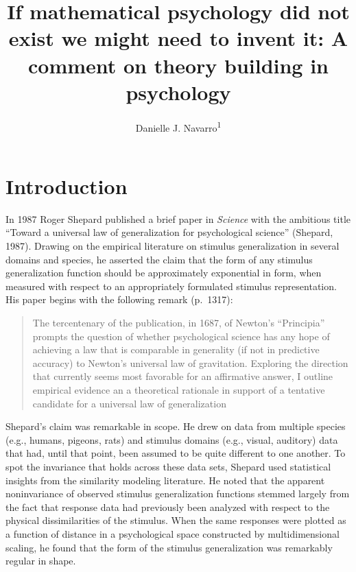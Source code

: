 \documentclass[
  english,
  doc]{apa6}
\author{Danielle J. Navarro\textsuperscript{1}}
\affiliation{
\vspace{0.5cm}
\textsuperscript{1} School of Psychology, University of New South Wales}
\title{If mathematical psychology did not exist we might need to invent it: A comment on theory building in psychology}
\date{}
\begin{document}
\maketitle

\vspace*{12pt}
\newpage

\hypertarget{introduction}{%
\section{Introduction}\label{introduction}}

\noindent
In 1987 Roger Shepard published a brief paper in \emph{Science} with the ambitious title \enquote{Toward a universal law of generalization for psychological science} (Shepard, 1987). Drawing on the empirical literature on stimulus generalization in several domains and species, he asserted the claim that the form of any stimulus generalization function should be approximately exponential in form, when measured with respect to an appropriately formulated stimulus representation. His paper begins with the following remark (p.~1317):

\begin{quote}
The tercentenary of the publication, in 1687, of Newton's \enquote{Principia} prompts the question of whether psychological science has any hope of achieving a law that is comparable in generality (if not in predictive accuracy) to Newton's universal law of gravitation. Exploring the direction that currently seems most favorable for an affirmative answer, I outline empirical evidence an a theoretical rationale in support of a tentative candidate for a universal law of generalization
\end{quote}

\noindent
Shepard's claim was remarkable in scope. He drew on data from multiple species (e.g., humans, pigeons, rats) and stimulus domains (e.g., visual, auditory) data that had, until that point, been assumed to be quite different to one another. To spot the invariance that holds across these data sets, Shepard used statistical insights from the similarity modeling literature. He noted that the apparent noninvariance of observed stimulus generalization functions stemmed largely from the fact that response data had previously been analyzed with respect to the physical dissimilarities of the stimulus. When the same responses were plotted as a function of distance in a psychological space constructed by multidimensional scaling, he found that the form of the stimulus generalization was remarkably regular in shape.
\end{document}
